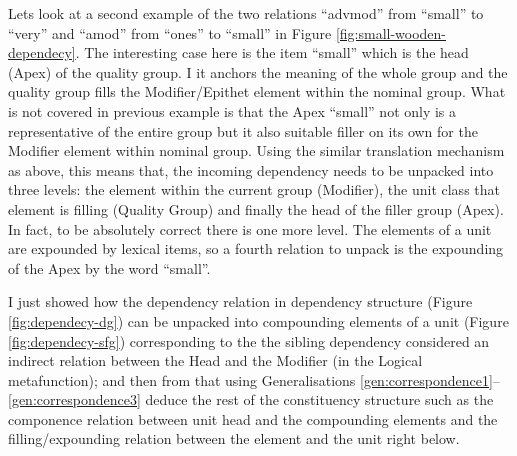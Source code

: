 Lets look at a second example of the two relations ``advmod'' from ``small'' to ``very'' and ``amod'' from ``ones'' to ``small'' in Figure \ref{fig:small-wooden-dependecy}. The interesting case here is the item ``small'' which is the head (Apex) of the quality group. I it anchors the meaning of the whole group and the quality group fills the Modifier/Epithet element within the nominal group. What is not covered in previous example is that the Apex ``small'' not only is a representative of the entire group but it also suitable filler on its own for the Modifier element within nominal group. Using the similar translation mechanism as above, this means that, the incoming dependency needs to be unpacked into three levels: the element within the current group (Modifier), the unit class that element is filling (Quality Group) and finally the head of the filler group (Apex). In fact, to be absolutely correct there is one more level. The elements of a unit are expounded by lexical items, so a fourth relation to unpack is the expounding of the Apex by the word ``small''.

I just showed how the dependency relation in dependency structure (Figure \ref{fig:dependecy-dg}) can be unpacked into compounding elements of a unit (Figure \ref{fig:dependecy-sfg}) corresponding to the the sibling dependency considered an indirect relation between the Head and the Modifier (in the Logical metafunction); and then from that using Generalisations \ref{gen:correspondence1}--\ref{gen:correspondence3} deduce the rest of the constituency structure such as the componence relation between unit head and the compounding elements and the filling/expounding relation between the element and the unit right below. 



